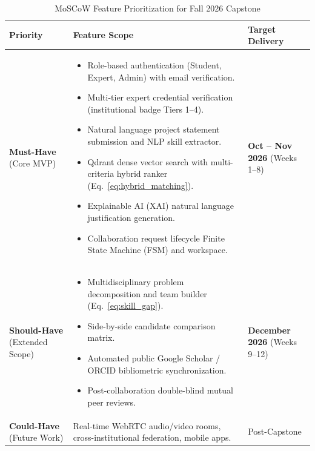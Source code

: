 \documentclass[11pt,a4paper]{article}
\begin{document}
\begin{table}[H]
\centering
\small
\caption{MoSCoW Feature Prioritization for Fall 2026 Capstone}
\label{tab:moscow}
\begin{tabularx}{\textwidth}{@{}p{2.6cm} X p{3.2cm}@{}}
\toprule
\textbf{Priority} & \textbf{Feature Scope} & \textbf{Target Delivery} \\
\midrule
\textbf{Must-Have} \newline (Core MVP) & 
\begin{itemize}[leftmargin=*,noitemsep]
    \item Role-based authentication (Student, Expert, Admin) with email verification.
    \item Multi-tier expert credential verification (institutional badge Tiers 1--4).
    \item Natural language project statement submission and NLP skill extractor.
    \item Qdrant dense vector search with multi-criteria hybrid ranker (Eq.~\ref{eq:hybrid_matching}).
    \item Explainable AI (XAI) natural language justification generation.
    \item Collaboration request lifecycle Finite State Machine (FSM) and workspace.
\end{itemize} & \textbf{Oct -- Nov 2026} \newline (Weeks 1--8) \\
\addlinespace
\textbf{Should-Have} \newline (Extended Scope) & 
\begin{itemize}[leftmargin=*,noitemsep]
    \item Multidisciplinary problem decomposition and team builder (Eq.~\ref{eq:skill_gap}).
    \item Side-by-side candidate comparison matrix.
    \item Automated public Google Scholar / ORCID bibliometric synchronization.
    \item Post-collaboration double-blind mutual peer reviews.
\end{itemize} & \textbf{December 2026} \newline (Weeks 9--12) \\
\addlinespace
\textbf{Could-Have} \newline (Future Work) & Real-time WebRTC audio/video rooms, cross-institutional federation, mobile apps. & Post-Capstone \\
\bottomrule
\end{tabularx}
\end{table}
\end{document}
